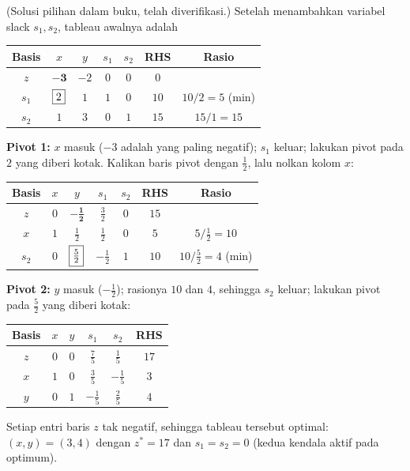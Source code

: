 
(Solusi pilihan dalam buku, telah diverifikasi.) Setelah menambahkan variabel
slack $s_1, s_2$, tableau awalnya adalah
\begin{center}
\renewcommand{\arraystretch}{1.3}
\begin{tabular}{c|cccc|c|c}
Basis & $x$ & $y$ & $s_1$ & $s_2$ & RHS & Rasio\\
\hline
$z$   & $\mathbf{-3}$ & $-2$ & $0$ & $0$ & $0$ & \\
\hline
$s_1$ & $\fbox{2}$ & $1$ & $1$ & $0$ & $10$ & $10/2 = 5$ (min)\\
$s_2$ & $1$ & $3$ & $0$ & $1$ & $15$ & $15/1 = 15$\\
\end{tabular}
\end{center}

\textbf{Pivot 1:} $x$ masuk ($-3$ adalah yang paling negatif); $s_1$ keluar;
lakukan pivot pada $2$ yang diberi kotak. Kalikan baris pivot dengan
$\tfrac12$, lalu nolkan kolom $x$:
\begin{center}
\renewcommand{\arraystretch}{1.3}
\begin{tabular}{c|cccc|c|c}
Basis & $x$ & $y$ & $s_1$ & $s_2$ & RHS & Rasio\\
\hline
$z$   & $0$ & $\mathbf{-\tfrac12}$ & $\tfrac32$ & $0$ & $15$ & \\
\hline
$x$   & $1$ & $\tfrac12$ & $\tfrac12$ & $0$ & $5$ & $5/\tfrac12 = 10$\\
$s_2$ & $0$ & $\fbox{$\tfrac52$}$ & $-\tfrac12$ & $1$ & $10$ & $10/\tfrac52 = 4$ (min) \\
\end{tabular}
\end{center}

\textbf{Pivot 2:} $y$ masuk ($-\tfrac12$); rasionya $10$ dan $4$, sehingga
$s_2$ keluar; lakukan pivot pada $\tfrac52$ yang diberi kotak:
\begin{center}
\renewcommand{\arraystretch}{1.3}
\begin{tabular}{c|cccc|c}
Basis & $x$ & $y$ & $s_1$ & $s_2$ & RHS\\
\hline
$z$   & $0$ & $0$ & $\tfrac75$ & $\tfrac15$ & $17$\\
\hline
$x$ & $1$ & $0$ & $\tfrac35$ & $-\tfrac15$ & $3$\\
$y$ & $0$ & $1$ & $-\tfrac15$ & $\tfrac25$ & $4$\\
\end{tabular}
\end{center}
Setiap entri baris $z$ tak negatif, sehingga tableau tersebut optimal:
$(x, y) = (3, 4)$ dengan $z^* = 17$ dan $s_1 = s_2 = 0$ (kedua kendala
aktif pada optimum).

